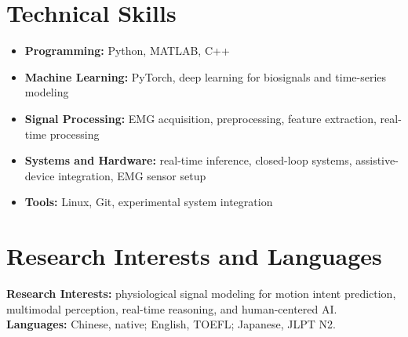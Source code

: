 \documentclass[10pt,letterpaper]{article}
\begin{document}
\section*{Technical Skills}
\begin{itemize}
  \item \textbf{Programming:} Python, MATLAB, C++
  \item \textbf{Machine Learning:} PyTorch, deep learning for biosignals and time-series modeling
  \item \textbf{Signal Processing:} EMG acquisition, preprocessing, feature extraction, real-time processing
  \item \textbf{Systems and Hardware:} real-time inference, closed-loop systems, assistive-device integration, EMG sensor setup
  \item \textbf{Tools:} Linux, Git, experimental system integration
\end{itemize}

\section*{Research Interests and Languages}
\textbf{Research Interests:} physiological signal modeling for motion intent prediction, multimodal perception, real-time reasoning, and human-centered AI.\\
\textbf{Languages:} Chinese, native; English, TOEFL; Japanese, JLPT N2.
\end{document}
